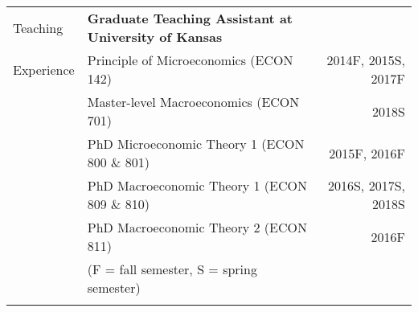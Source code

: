 \documentclass[letterpaper, 11pt]{article}
\begin{document}
\noindent \begin{tabular}{@{} p{3cm} p{10cm} r}
	\Large{Teaching}   & \textbf{Graduate Teaching Assistant at University of Kansas} \\
	\Large{Experience} & \hspace{5mm}Principle of Microeconomics (ECON 142) & 2014F, 2015S, 2017F \\
	& \hspace{5mm}Master-level Macroeconomics (ECON 701) & 2018S \\ 
	& \hspace{5mm}PhD Microeconomic Theory 1 (ECON 800 \& 801) & 2015F, 2016F \\
	& \hspace{5mm}PhD Macroeconomic Theory 1 (ECON 809 \& 810) & 2016S, 2017S, 2018S \\
	& \hspace{5mm}PhD Macroeconomic Theory 2 (ECON 811) & 2016F \\
	& \hspace{5mm} (F = fall semester, S = spring semester) \\
	& \\
\end{tabular}
\end{document}
